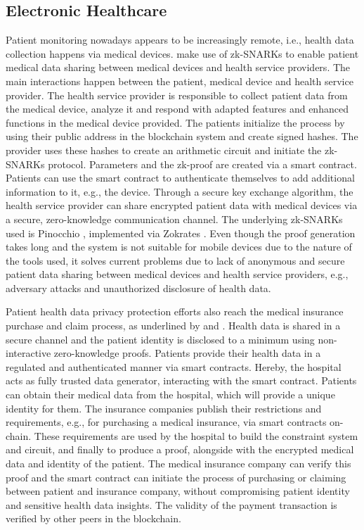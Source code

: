 \subsection{Electronic Healthcare}
Patient monitoring nowadays appears to be increasingly remote, i.e., health data collection happens via medical devices. \citet{LuongPark} make use of zk-SNARKs to enable patient medical data sharing between medical devices and health service providers. The main interactions happen between the patient, medical device and health service provider. The health service provider is responsible to collect patient data from the medical device, analyze it and respond with adapted features and enhanced functions in the medical device provided. The patients initialize the process by using their public address in the blockchain system and create signed hashes. The provider uses these hashes to create an arithmetic circuit and initiate the zk-SNARKs protocol. Parameters and the zk-proof are created via a smart contract. Patients can use the smart contract to authenticate themselves to add additional information to it, e.g., the device. Through a secure key exchange algorithm, the health service provider can share encrypted patient data with medical devices via a secure, zero-knowledge communication channel. The underlying zk-SNARKs used is Pinocchio \citep{Pinocchio}, implemented via Zokrates \citep{ZoKrates}. Even though the proof generation takes long and the system is not suitable for mobile devices due to the nature of the tools used, it solves current problems due to lack of anonymous and secure patient data sharing between medical devices and health service providers, e.g., adversary attacks and unauthorized disclosure of health data.

Patient health data privacy protection efforts also reach the medical insurance purchase and claim process, as underlined by \citet{ZHENG} and \citet{WangEtAl}. Health data is shared in a secure channel and the patient identity is disclosed to a minimum using non-interactive zero-knowledge proofs. Patients provide their health data in a regulated and authenticated manner via smart contracts. Hereby, the hospital acts as fully trusted data generator, interacting with the smart contract. Patients can obtain their medical data from the hospital, which will provide a unique identity for them. The insurance companies publish their restrictions and requirements, e.g., for purchasing a medical insurance, via smart contracts on-chain. These requirements are used by the hospital to build the constraint system and circuit, and finally to produce a proof, alongside with the encrypted medical data and identity of the patient. The medical insurance company can verify this proof and the smart contract can initiate the process of purchasing or claiming between patient and insurance company, without compromising patient identity and sensitive health data insights. The validity of the payment transaction is verified by other peers in the blockchain.

